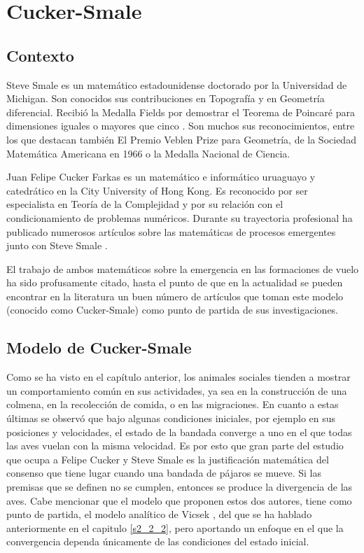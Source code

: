 \section{Cucker-Smale} \label{s3_2}
\subsection{Contexto} \label{s3_2_1}
Steve Smale es un matemático estadounidense doctorado por la Universidad de Michigan. Son conocidos sus contribuciones en Topografía y en Geometría diferencial. Recibió la Medalla Fields por demostrar el Teorema de Poincaré para dimensiones iguales o mayores que cinco \cite{StephenSmaleBio}. Son muchos sus reconocimientos, entre los que destacan también El Premio Veblen Prize para Geometría, de la Sociedad Matemática Americana en 1966 o la Medalla Nacional de Ciencia.

Juan Felipe Cucker Farkas es un matemático e informático uruaguayo y catedrático en la City University of Hong Kong. Es reconocido por ser especialista en Teoría de la Complejidad y por su relación con el condicionamiento de problemas numéricos. Durante su trayectoria profesional ha publicado numerosos artículos sobre las matemáticas de procesos emergentes junto con Steve Smale \cite{FelipeCuckerBio}.

El trabajo de ambos matemáticos sobre la emergencia en las formaciones de vuelo ha sido profusamente citado, hasta el punto de que en la actualidad se pueden encontrar en la literatura un buen número de artículos que toman este modelo (conocido como Cucker-Smale) como punto de partida de sus investigaciones.

\subsection{Modelo de Cucker-Smale} \label{s3_2_2}
Como se ha visto en el capítulo anterior, los animales sociales tienden a mostrar un comportamiento común en sus actividades, ya sea en la construcción de una colmena, en la recolección de comida, o en las migraciones. En cuanto a estas últimas se observó que bajo algunas condiciones iniciales, por ejemplo en sus posiciones y velocidades, el estado de la bandada converge a uno en el que todas las aves vuelan con la misma velocidad. Es por esto que gran parte del estudio que ocupa a Felipe Cucker y Steve Smale es la justificación matemática del consenso que tiene lugar cuando una bandada de pájaros se mueve. Si las premisas que se definen no se cumplen, entonces se produce la divergencia de las aves. Cabe mencionar que el modelo que proponen estos dos autores, tiene como punto de partida, el modelo analítico  de Vicsek \cite{vicsek1995novel}, del que se ha hablado anteriormente en el capitulo \ref{s2_2_2}, pero aportando un enfoque en el que la convergencia dependa únicamente de las condiciones del estado inicial.

